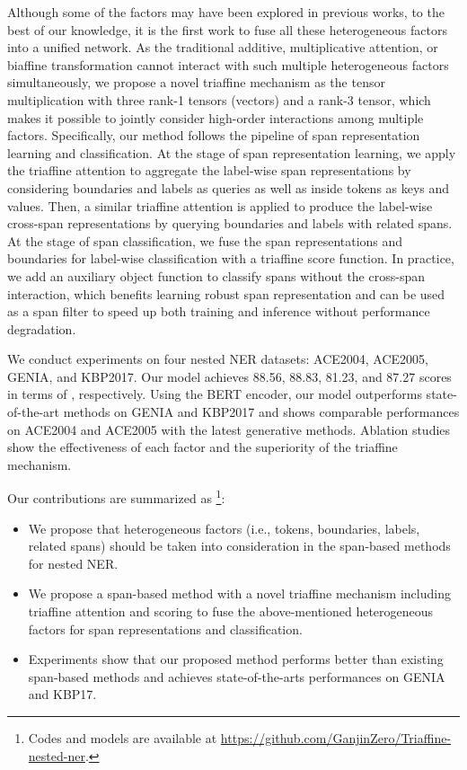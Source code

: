 \documentclass[11pt]{article}
\begin{document}
Although some of the factors may have been explored in previous works, to the best of our knowledge, it is the first work to fuse all these heterogeneous factors into a unified network. As the traditional additive, multiplicative attention, or biaffine transformation cannot interact with such multiple heterogeneous factors simultaneously, we propose a novel triaffine mechanism as the tensor multiplication with three rank-1 tensors (vectors) and a rank-3 tensor, which makes it possible to jointly consider high-order interactions among multiple factors. Specifically, our method follows the pipeline of span representation learning and classification. At the stage of span representation learning, we apply the triaffine attention to aggregate the label-wise span representations by considering boundaries and labels as queries as well as inside tokens as keys and values. Then, a similar triaffine attention is applied to produce the label-wise cross-span representations by querying boundaries and labels with related spans. At the stage of span classification, we fuse the span representations and boundaries for label-wise classification with a triaffine score function. 
In practice, we add an auxiliary object function to classify spans without the cross-span interaction, which benefits learning robust span representation and can be used as a span filter to speed up both training and inference without performance degradation.

We conduct experiments on four nested NER datasets: ACE2004, ACE2005, GENIA, and KBP2017. 
Our model achieves 88.56, 88.83, 81.23, and 87.27 scores in terms of , respectively.
Using the BERT encoder, our model outperforms state-of-the-art methods on GENIA and KBP2017 and shows comparable performances on ACE2004 and ACE2005 with the latest generative methods.
Ablation studies show the effectiveness of each factor and the superiority of the triaffine mechanism. 


Our contributions are summarized as \footnote{Codes and models are available at \url{https://github.com/GanjinZero/Triaffine-nested-ner}.}:
\begin{itemize}
    \item We propose that heterogeneous factors (i.e., tokens, boundaries, labels, related spans) should be taken into consideration in the span-based methods for nested NER.
    \item We propose a span-based method with a novel triaffine mechanism including triaffine attention and scoring to fuse the above-mentioned heterogeneous factors for span representations and classification.
    \item Experiments show that our proposed method performs better than existing span-based methods and achieves state-of-the-arts performances on GENIA and KBP17.
\end{itemize}
\end{document}
